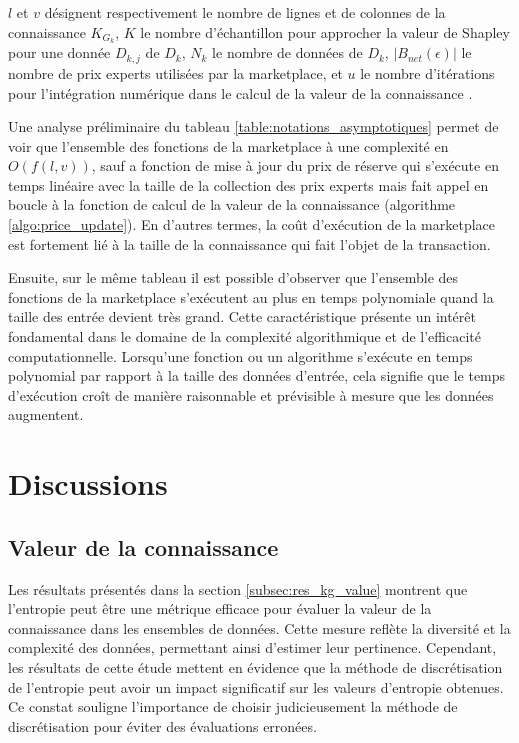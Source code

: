 $l$ et $v$ désignent respectivement le nombre de lignes et de colonnes de la connaissance $K_{G_k}$, $K$ le nombre d'échantillon pour approcher la valeur de Shapley pour une donnée $D_{k,j}$ de $D_k$, $N_k$ le nombre de données de $D_k$, $|B_{net}(\epsilon)|$ le nombre de prix experts utilisées par la marketplace, et $u$ le nombre d'itérations pour l'intégration numérique dans le calcul de la valeur de la connaissance . 

Une analyse préliminaire du tableau \ref{table:notations_asymptotiques} permet de voir que l'ensemble des fonctions de la marketplace à une complexité en $O(f(l,v))$, sauf a fonction de mise à jour du prix de réserve qui s'exécute en temps linéaire avec la taille de la collection des prix experts mais fait appel en boucle à la fonction de calcul de la valeur de la connaissance (algorithme \ref{algo:price_update}). En d'autres termes, la coût d'exécution de la marketplace est fortement lié à la taille de la connaissance qui fait l'objet de la transaction.

Ensuite, sur le même tableau il est possible d'observer que l'ensemble des fonctions de la marketplace s'exécutent au plus en temps polynomiale quand la taille des entrée devient très grand. Cette caractéristique présente un intérêt fondamental dans le domaine de la complexité algorithmique et de l'efficacité computationnelle. Lorsqu'une fonction ou un algorithme s'exécute en temps polynomial par rapport à la taille des données d'entrée, cela signifie que le temps d'exécution croît de manière raisonnable et prévisible à mesure que les données augmentent.


\section{Discussions} \label{sec:discussions}

\subsection{Valeur de la connaissance} \label{subsec: discuss_kg_value}

Les résultats présentés dans la section \ref{subsec:res_kg_value} montrent que l'entropie peut être une métrique efficace pour évaluer la valeur de la connaissance dans les ensembles de données. Cette mesure reflète la diversité et la complexité des données, permettant ainsi d'estimer leur pertinence. Cependant, les résultats de cette étude mettent en évidence que la méthode de discrétisation de l'entropie peut avoir un impact significatif sur les valeurs d'entropie obtenues. Ce constat  souligne l'importance de choisir judicieusement la méthode de discrétisation pour éviter des évaluations erronées.

